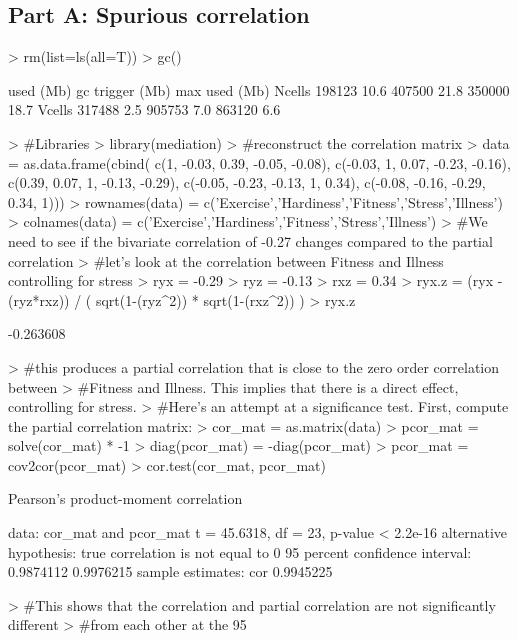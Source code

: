 \documentclass{article}
\begin{document}
\subsection{Part A: Spurious correlation}
\begin{Schunk}
\begin{Sinput}
> rm(list=ls(all=T))
> gc()
\end{Sinput}
\begin{Soutput}
         used (Mb) gc trigger (Mb) max used (Mb)
Ncells 198123 10.6     407500 21.8   350000 18.7
Vcells 317488  2.5     905753  7.0   863120  6.6
\end{Soutput}
\begin{Sinput}
> #Libraries
> library(mediation)
> #reconstruct the correlation matrix
> data = as.data.frame(cbind(
   c(1, -0.03, 0.39, -0.05, -0.08),
   c(-0.03, 1, 0.07, -0.23, -0.16),
   c(0.39, 0.07, 1, -0.13, -0.29),
 	c(-0.05, -0.23, -0.13, 1, 0.34),
 	c(-0.08, -0.16, -0.29, 0.34, 1)))
> rownames(data) = c('Exercise','Hardiness','Fitness','Stress','Illness')
> colnames(data) = c('Exercise','Hardiness','Fitness','Stress','Illness')
> #We need to see if the bivariate correlation of -0.27 changes compared to the partial correlation
> #let's look at the correlation between Fitness and Illness controlling for stress
> ryx = -0.29
> ryz = -0.13
> rxz = 0.34
> ryx.z = (ryx - (ryz*rxz)) / ( sqrt(1-(ryz^2)) * sqrt(1-(rxz^2)) )
> ryx.z
\end{Sinput}
\begin{Soutput}
[1] -0.263608
\end{Soutput}
\begin{Sinput}
> #this produces a partial correlation that is close to the zero order correlation between 
> #Fitness and Illness.  This implies that there is a direct effect, controlling for stress.
> #Here's an attempt at a significance test.  First, compute the partial correlation matrix:
> cor_mat = as.matrix(data)
> pcor_mat = solve(cor_mat) * -1
> diag(pcor_mat) = -diag(pcor_mat)
> pcor_mat = cov2cor(pcor_mat)
> cor.test(cor_mat, pcor_mat)
\end{Sinput}
\begin{Soutput}
	Pearson's product-moment correlation

data:  cor_mat and pcor_mat 
t = 45.6318, df = 23, p-value < 2.2e-16
alternative hypothesis: true correlation is not equal to 0 
95 percent confidence interval:
 0.9874112 0.9976215 
sample estimates:
      cor 
0.9945225 
\end{Soutput}
\begin{Sinput}
> #This shows that the correlation and partial correlation are not significantly different 
> #from each other at the 95%
\end{Sinput}
\end{Schunk}
\end{document}
